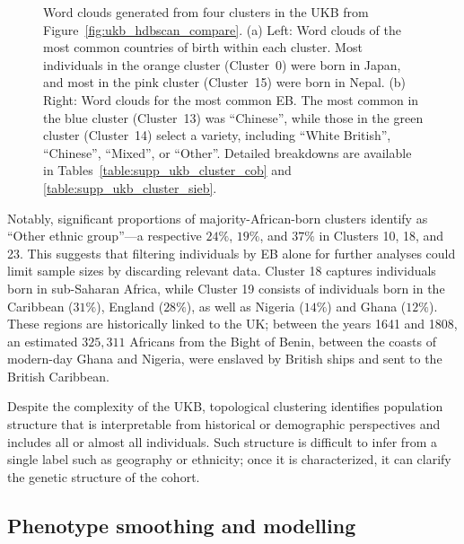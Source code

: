 \begin{figure}[ht]
\begin{subfigure}[b]{0.45\linewidth}
    \caption{}
    \label{fig:supp_ukb_hdbscan_top2}
  \end{subfigure}
  \caption[Word clouds generated from four clusters in the UKB]{Word clouds generated from four clusters in the UKB from Figure~\ref{fig:ukb_hdbscan_compare}. (a) Left: Word clouds of the most common countries of birth within each cluster. Most individuals in the orange cluster (Cluster~0) were born in Japan, and most in the pink cluster (Cluster~15) were born in Nepal. (b) Right: Word clouds for the most common EB. The most common in the blue cluster (Cluster~13) was ``Chinese'', while those in the green cluster (Cluster~14) select a variety, including ``White British'', ``Chinese'', ``Mixed'', or ``Other''. Detailed breakdowns are available in Tables~\ref{table:supp_ukb_cluster_cob} and \ref{table:supp_ukb_cluster_sieb}.}
  \label{fig:supp_ukb_hdbscan_top}
\end{figure}

Notably, significant proportions of majority-African-born clusters identify as ``Other ethnic group''---a respective $24\%$, $19\%$, and $37\%$ in Clusters 10, 18, and 23. This suggests that filtering individuals by EB alone for further analyses could limit sample sizes by discarding relevant data. Cluster 18 captures individuals born in sub-Saharan Africa, while Cluster 19 consists of individuals born in the Caribbean ($31\%$), England ($28\%$), as well as Nigeria ($14\%$) and Ghana ($12\%$). These regions are historically linked to the UK; between the years 1641 and 1808, an estimated $325,311$ Africans from the Bight of Benin, between the coasts of modern-day Ghana and Nigeria, were enslaved by British ships and sent to the British Caribbean\citep{slavevoyages,fortes-lima_anthropological_2021}.

Despite the complexity of the UKB, topological clustering identifies population structure that is interpretable from historical or demographic perspectives and includes all or almost all individuals. Such structure is difficult to infer from a single label such as geography or ethnicity; once it is characterized, it can clarify the genetic structure of the cohort. 

\subsection{Phenotype smoothing and modelling}


